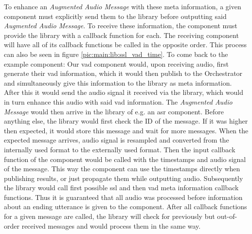 To enhance an \textit{Augmented Audio Message} with these meta information, a given component must explicitly send them to the library before outputting said \textit{Augmented Audio Message}.
To receive these information, the component must provide the library with a callback function for each.
The receiving component will have all of its callback functions be called in the opposite order.
This process can also be seen in figure \ref{pic:main:lib:ssl_vad_time}.
To come back to the example component:
Our \gls{vad} component would, upon receiving audio, first generate their \gls{vad} information, which it would then publish to the Orchestrator and simultaneously give this information to the library as meta information.
After this it would send the audio signal it received via the library, which would in turn enhance this audio with said \gls{vad} information.
The \textit{Augmented Audio Message} would then arrive in the library of e.g. an \gls{asr} component.
Before anything else, the library would first check the ID of the message.
If it was higher then expected, it would store this message and wait for more messages.
When the expected message arrives, audio signal is resampled and converted from the internally used format to the externally used format.
Then the input callback function of the component would be called with the timestamps and audio signal of the message.
This way the component can use the timestamps directly when publishing results, or just propagate them while outputting audio.
Subsequently the library would call first possible \gls{ssl} and then \gls{vad} meta information callback functions.
Thus it is guaranteed that all audio was processed before information about an ending utterance is given to the component. 
After all callback functions for a given message are called, the library will check for previously but out-of-order received messages and would process them in the same way.




